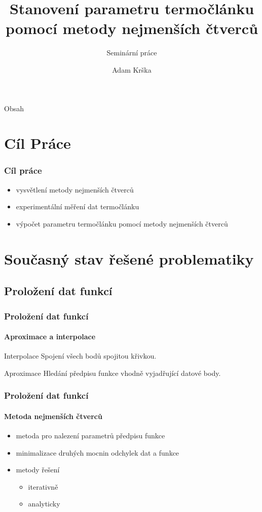 \documentclass[smaller,aspectratio=1610,handout]{beamer}
\author[A. Krška]{Adam Krška}
\title[Stanovení parametru termočlánku]{Stanovení parametru termočlánku pomocí
metody nejmenších čtverců}
\subtitle{Seminární práce}
\institute[GSS Mikulov]{Gymnázium a střední odborná škola Mikulov}
\date{}
\newcommand\sumi{\sum_{i=1}^n}
\begin{document}
\frame{\titlepage}

\begin{frame}{Obsah}
	\tableofcontents
\end{frame}

\section{Cíl Práce}

\begin{frame}
	\frametitle{Cíl práce}
	\begin{itemize}
		\item vysvětlení metody nejmenších čtverců
		\item experimentální měření dat termočlánku
		\item výpočet parametru termočlánku pomocí metody nejmenších čtverců
	\end{itemize}	
\end{frame}

\section{Současný stav řešené problematiky}
\subsection{Proložení dat funkcí}

\begin{frame}
	\frametitle{Proložení dat funkcí}
	\framesubtitle{Aproximace a interpolace}
	
	\begin{block}{Interpolace}
		Spojení všech bodů spojitou křivkou.	
	\end{block}

	\begin{block}{Aproximace}
		Hledání předpisu funkce vhodně vyjadřující datové body.	
	\end{block}
\end{frame}

\begin{frame}
	\frametitle{Proložení dat funkcí}
	\framesubtitle{Metoda nejmenších čtverců}
	\begin{itemize}
		\item metoda pro nalezení parametrů předpisu funkce
		\item minimalizace druhých mocnin odchylek dat a funkce 
	\end{itemize}

	\eq{S=\sumi\(y_i-f(x_i)\)^2}

	\begin{itemize}
		\item metody řešení
			\begin{itemize}
				\item iterativně
				\item analyticky
			\end{itemize}
	\end{itemize}
\end{frame}
\end{document}
